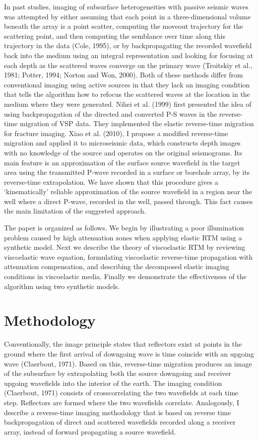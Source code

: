 In past studies, imaging of subsurface heterogeneities with passive seismic waves was attempted by either assuming that each point in a three-dimensional volume beneath the array is a point scatter, computing the moveout trajectory for the scattering point, and then computing the semblance over time along this trajectory in the data (Cole, 1995), or by backpropagating the recorded wavefield back into the medium using an integral representation and looking for focusing at each depth as the scattered waves converge on the primary wave (Troitskiy et al., 1981; Potter, 1994; Norton and Won, 2000). Both of these methods differ from conventional imaging using active sources in that they lack an imaging condition that tells the algorithm how to refocus the scattered waves at the location in the medium where they were generated. Nihei et al. (1999) first presented the idea of using backpropagation of the directed and converted P-S waves in the reverse-time migration of VSP data. They implemented the elastic reverse-time migration for fracture imaging. Xiao et al. (2010), 
I propose a modified reverse-time migration and applied it to microseismic data, which constructs depth images with no knowledge of the source and operates on the original seismograms. Its main feature is an approximation of the surface source wavefield in the target area using the transmitted P-wave recorded in a surface or borehole array, by its reverse-time extrapolation. We have shown that this procedure gives a ‘kinematically’ reliable approximation of the source wavefield in a region near the well where a direct P-wave, recorded in the well, passed through. This fact causes the main limitation of the suggested approach.


The paper is organized as follows. We begin by illustrating a poor illumination problem caused by high attenuation zones when applying elastic RTM using a synthetic model. Next we describe the theory of viscoelastic RTM by reviewing viscoelastic wave equation, formulating viscoelastic reverse-time propagation with attenuation compensation, and describing the decomposed elastic imaging conditions in viscoelastic media. Finally we demonstrate the effectiveness of the algorithm using two synthetic models.

\section{Methodology}
Conventionally, the image principle states that reflectors exist at points in the ground where the first arrival of downgoing wave is time coincide with an upgoing wave (Claerbout, 1971). Based on this, reverse-time migration produces an image of the subsurface by extrapolating both the source downgoing and receiver upgoing wavefields into the interior of the earth. The imaging condition (Claerbout, 1971) consists of crosscorrelating the two wavefields at each time step. Reflectors are formed where the two wavefields correlate. 
Analogously, I describe a reverse-time imaging methodology that is based on reverse time backpropagation of direct and scattered wavefields recorded along a receiver array, instead of forward propagating a source wavefield. 

